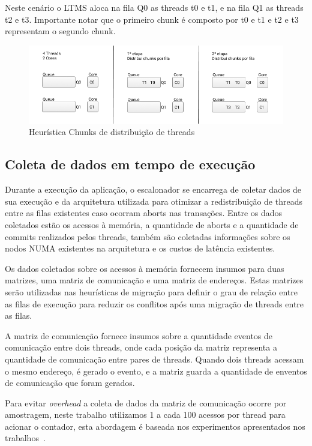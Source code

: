 \documentclass[diss,capa]{texufpel}
\begin{document}
Neste cenário o LTMS aloca na fila Q0 as threads t0 e t1, e na fila Q1 as threads t2 e t3. Importante notar que o primeiro chunk é composto por t0 e t1 e t2 e t3 representam o segundo chunk.

\begin{figure}[htbp]
\centering
\includegraphics[scale=.6]{images/Queue_chunks.png}
\caption{Heurística Chunks de distribuição de threads}
\label{chunks}
\end{figure}


\subsection{Coleta de dados em tempo de execução}
\label{coleta}

Durante a execução da aplicação, o escalonador se encarrega de coletar dados de sua execução e da arquitetura utilizada para otimizar a redistribuição de threads entre as filas existentes caso ocorram aborts nas transações. Entre os dados coletados estão os acessos à memória, a quantidade de aborts e a quantidade de commits realizados pelos threads, também são coletadas informações sobre os nodos NUMA existentes na arquitetura e os custos de latência existentes.

Os dados coletados sobre os acessos à memória fornecem insumos para duas matrizes, uma matriz de comunicação e uma matriz de endereços. Estas matrizes serão utilizadas nas heurísticas de migração para definir o grau de relação entre as filas de execução para reduzir os conflitos após uma migração de threads entre as filas.

A matriz de comunicação fornece insumos sobre a quantidade eventos de comunicação entre dois threads, onde cada posição da matriz representa a quantidade de comunicação entre pares de threads. Quando dois threads acessam o mesmo endereço, é gerado o evento, e a matriz guarda a quantidade de enventos de comunicação que foram gerados.

Para evitar \emph{overhead} a coleta de dados da matriz de comunicação ocorre por amostragem, neste trabalho utilizamos 1 a cada 100 acessos por thread para acionar o contador, esta abordagem é baseada nos experimentos apresentados nos trabalhos~\cite{pasqualin2020online}. 
\end{document}
